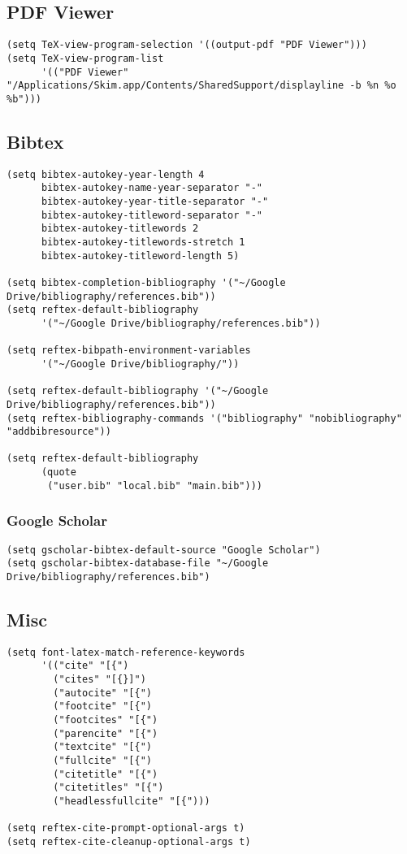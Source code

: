 \documentclass[11pt]{article}
\begin{document}
\subsection{PDF Viewer}
\label{sec:orgheadline34}
\begin{verbatim}
(setq TeX-view-program-selection '((output-pdf "PDF Viewer")))
(setq TeX-view-program-list
      '(("PDF Viewer" "/Applications/Skim.app/Contents/SharedSupport/displayline -b %n %o %b")))
\end{verbatim}
\subsection{Bibtex}
\label{sec:orgheadline36}
\begin{verbatim}
(setq bibtex-autokey-year-length 4
      bibtex-autokey-name-year-separator "-"
      bibtex-autokey-year-title-separator "-"
      bibtex-autokey-titleword-separator "-"
      bibtex-autokey-titlewords 2
      bibtex-autokey-titlewords-stretch 1
      bibtex-autokey-titleword-length 5)

(setq bibtex-completion-bibliography '("~/Google Drive/bibliography/references.bib"))
(setq reftex-default-bibliography
      '("~/Google Drive/bibliography/references.bib"))

(setq reftex-bibpath-environment-variables
      '("~/Google Drive/bibliography/"))

(setq reftex-default-bibliography '("~/Google Drive/bibliography/references.bib"))
(setq reftex-bibliography-commands '("bibliography" "nobibliography" "addbibresource"))

(setq reftex-default-bibliography
      (quote
       ("user.bib" "local.bib" "main.bib")))
\end{verbatim}
\subsubsection{Google Scholar}
\label{sec:orgheadline35}
\begin{verbatim}
(setq gscholar-bibtex-default-source "Google Scholar")
(setq gscholar-bibtex-database-file "~/Google Drive/bibliography/references.bib")
\end{verbatim}
\subsection{Misc}
\label{sec:orgheadline37}
\begin{verbatim}
(setq font-latex-match-reference-keywords
      '(("cite" "[{")
        ("cites" "[{}]")
        ("autocite" "[{")
        ("footcite" "[{")
        ("footcites" "[{")
        ("parencite" "[{")
        ("textcite" "[{")
        ("fullcite" "[{")
        ("citetitle" "[{")
        ("citetitles" "[{")
        ("headlessfullcite" "[{")))

(setq reftex-cite-prompt-optional-args t)
(setq reftex-cite-cleanup-optional-args t)
\end{verbatim}
\end{document}

